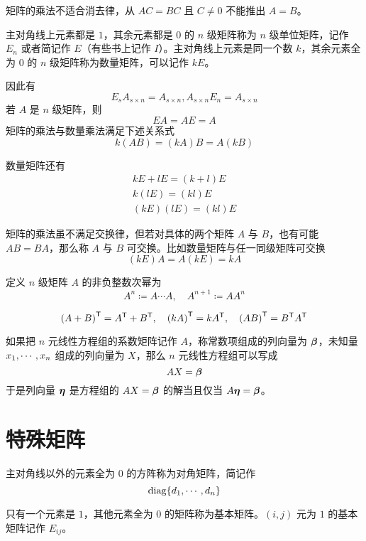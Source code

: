 矩阵的乘法不适合消去律，从 $AC = BC$ 且 $C\ne 0$ 不能推出 $A=B$。

主对角线上元素都是 $1$，其余元素都是 $0$ 的 $n$ 级矩阵称为 $n$ 级单位矩阵，记作 $E_n$ 或者简记作 $E$（有些书上记作 $I$）。主对角线上元素是同一个数 $k$，其余元素全为 $0$ 的 $n$ 级矩阵称为数量矩阵，可以记作 $kE$。

因此有
\[E_s A_{s \times n} = A_{s \times n}, A_{s \times n} E_n= A_{s \times n}\]
若 $A$ 是 $n$ 级矩阵，则
\[EA = AE = A\]
矩阵的乘法与数量乘法满足下述关系式
\[k(AB) = (kA)B = A(kB)\]

数量矩阵还有
\[ \begin{aligned}
		kE + lE = (k+l)E \\
		k(lE) = (kl)E    \\
		(kE)(lE) = (kl)E
	\end{aligned} \]

矩阵的乘法虽不满足交换律，但若对具体的两个矩阵 $A$ 与 $B$，也有可能 $AB = BA$，那么称 $A$ 与 $B$ 可交换。比如数量矩阵与任一同级矩阵可交换
\[(kE)A = A(kE) = kA\]

\begin{definition}
	定义 $n$ 级矩阵 $A$ 的非负整数次幂为
	\[ A^n \coloneqq  A \cdots A, \quad A^{n+1} \coloneqq A A^{n} \]
\end{definition}


\begin{theorem}
	\[ {(A+B)}^\mathsf{T} = {A}^\mathsf{T} + {B}^\mathsf{T}, \quad {(kA)}^\mathsf{T} = k{A}^\mathsf{T}, \quad {(AB)}^\mathsf{T} = {B}^\mathsf{T}{A}^\mathsf{T} \]
\end{theorem}

如果把 $n$ 元线性方程组的系数矩阵记作 $A$，称常数项组成的列向量为 $\boldsymbol{\beta}$，未知量 $x_1,\cdots,x_n$ 组成的列向量为 $X$，那么 $n$ 元线性方程组可以写成
\[AX = \boldsymbol{\beta}\]
于是列向量 $\boldsymbol{\eta}$ 是方程组的 $AX = \boldsymbol{\beta}$ 的解当且仅当 $A \boldsymbol{\eta} = \boldsymbol{\beta}$。

\section{特殊矩阵}

\begin{definition}
	主对角线以外的元素全为 $0$ 的方阵称为对角矩阵，简记作
	\[\operatorname{diag}\{d_1,\cdots,d_n\}\]
\end{definition}

\begin{definition}
	只有一个元素是 $1$，其他元素全为 $0$ 的矩阵称为基本矩阵。$(i,j)$ 元为 $1$ 的基本矩阵记作 $E_{ij}$。
\end{definition}

